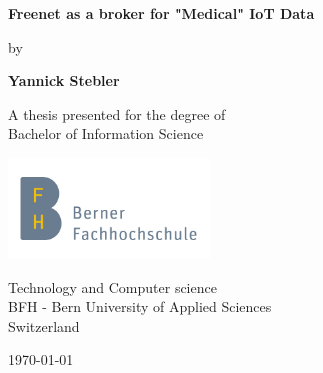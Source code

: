\documentclass[12pt,oneside]{scrartcl}
\begin{document}
\renewcommand{\figurename}{Abb.}
\pagestyle{empty}
\begin{titlepage}
    \begin{center}
        \vspace*{1cm}
            
        \Huge
        \textbf{Freenet as a broker for "Medical" IoT Data}
            
        \vspace{1cm}
        \LARGE
        by
            
        \vspace{1cm}
            
        \textbf{Yannick Stebler}
            
        \vfill
            
        A thesis presented for the degree of\\
        Bachelor of Information Science
            
        \vspace{0.8cm}
            
        \includegraphics[width=0.4\textwidth]{BFHLOGO}
            
        \Large
        Technology and Computer science\\
        BFH - Bern University of Applied Sciences\\
        Switzerland\\
        {\large \today\par}
            
    \end{center}
\end{titlepage}
\newpage
{}
\pagestyle{fancy}
\fancyhf{}
    
    \newpage
\tableofcontents
\newpage
    
    \newpage
    
    \newpage
    
    \newpage
    
    \newpage
    
    \newpage
    
\end{document}
